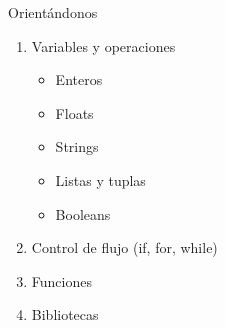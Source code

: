 \documentclass{beamer}
\begin{document}
\begin{frame}{Orientándonos}

\begin{enumerate}
    \item Variables y operaciones
  \begin{itemize}
      \item Enteros
      \item Floats
      \item Strings
    \item Listas y tuplas
    \item Booleans
  \end{itemize}  

\item  Control de flujo (if, for, while)
\item  Funciones
\item  Bibliotecas
\end{enumerate}

\end{frame}
\end{document}
